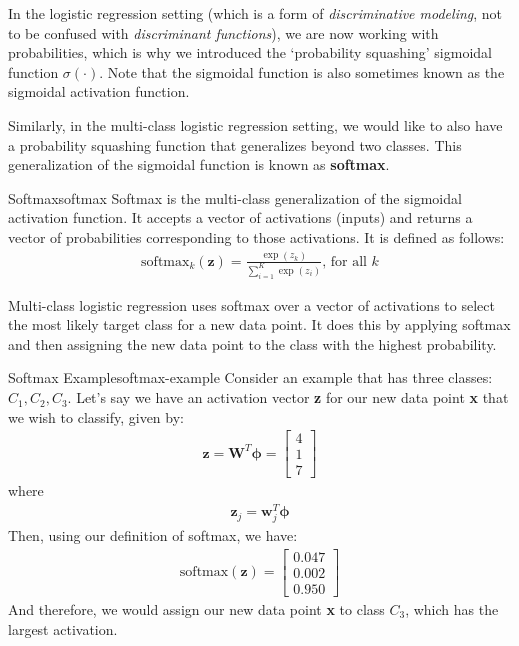In the logistic regression setting (which is a form of \textit{discriminative modeling}, not to be confused with \textit{discriminant functions}), we are now working with probabilities, which is why we introduced the `probability squashing' sigmoidal function $\sigma(\cdot)$. Note that the sigmoidal function is also sometimes known as the sigmoidal activation function.

Similarly, in the multi-class logistic regression setting, we would like to also have a probability squashing function that generalizes beyond two classes. This generalization of the sigmoidal function is known as \textbf{softmax}.

\begin{definition}{Softmax}{softmax}
Softmax is the multi-class generalization of the sigmoidal activation function. It accepts a vector of activations (inputs) and returns a vector of probabilities corresponding to those activations. It is defined as follows:
\begin{align*}
	\text{softmax}_{k}(\textbf{z}) = \frac{\exp{(z_{k})}}{\sum_{i=1}^{K} \exp{(z_{i})}}\text{, for all $k$}
\end{align*}
\end{definition}

Multi-class logistic regression uses softmax over a vector of activations to select the most likely target class for a new data point. It does this by applying softmax and then assigning the new data point to the class with the highest probability.

\begin{example}{Softmax Example}{softmax-example}
	Consider an example that has three classes: $C_{1}, C_{2}, C_{3}$. Let's say we have an activation vector \textbf{z} for our new data point \textbf{x} that we wish to classify, given by:
	\begin{align*}
		\textbf{z} = \textbf{W}^{T}\boldsymbol{\phi} =
			\begin{bmatrix}
		    	4 \\
		        1 \\
		        7
		    \end{bmatrix}
	\end{align*}
	where
	\begin{align*}
		\textbf{z}_{j} = \textbf{w}_{j}^{T}\boldsymbol{\phi}
	\end{align*}
	Then, using our definition of softmax, we have:
	\begin{align*}
		\text{softmax}(\textbf{z}) =
			\begin{bmatrix}
				0.047 \\
				0.002 \\
				0.950
		    \end{bmatrix}
	\end{align*}
	And therefore, we would assign our new data point \textbf{x} to class $C_{3}$, which has the largest activation.
\end{example}

